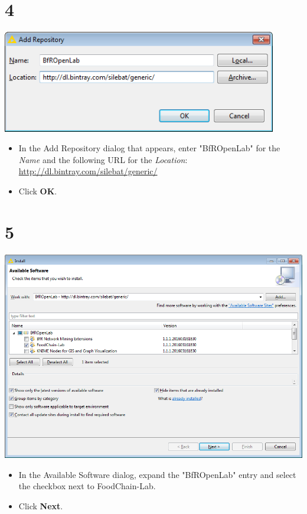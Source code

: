 \documentclass{beamer}
\begin{document}
\section{4}
\begin{frame}
	\begin{center}
  		\includegraphics[width=0.9\textwidth]{4.png}
	\end{center}
	\begin{itemize}
		\item In the Add Repository dialog that appears, enter "BfROpenLab" for the \textit{Name} and the following URL for the \textit{Location}: \url{http://dl.bintray.com/silebat/generic/}
		\item Click \textbf{OK}.
	\end{itemize}
\end{frame}

\section{5}
\begin{frame}
	\begin{center}
  		\includegraphics[height=0.7\textheight]{5.png}
	\end{center}
	\begin{itemize}
		\item In the Available Software dialog, expand the "BfROpenLab" entry and select the checkbox next to FoodChain-Lab.
		\item Click \textbf{Next}.
	\end{itemize}
\end{frame}
\end{document}
